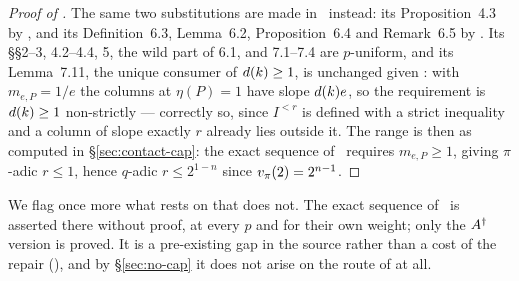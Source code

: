 \begin{proof}[Proof of ]
The same two substitutions are made in~\cite{kramermillerupton2021newton} instead:
its Proposition~4.3 by , and its Definition~6.3, Lemma~6.2,
Proposition~6.4 and Remark~6.5 by . Its \S\S2--3, 4.2--4.4,
5, the wild part of 6.1, and 7.1--7.4 are $p$-uniform, and its Lemma~7.11,
the unique consumer of $d(k)\ge 1$, is unchanged given
: with $m_{e,P} = 1/e$ the columns at $\eta(P) = 1$ have
slope $d(k)e$, so the requirement is $d(k)\ge 1$
non-strictly --- correctly so, since $I^{<r}$ is defined with a strict
inequality and a column of slope exactly $r$ already lies outside it. The
range is then as computed in \S\ref{sec:contact-cap}: the exact sequence of~\cite[\S6.2]{kramermillerupton2021newton} requires $m_{e,P}\ge 1$, giving $\pi$-adic
$r \le 1$, hence $q$-adic $r \le 2^{1-n}$ since $v_{\pi}(2) = 2^{n-1}$.
\end{proof}

We flag once more what  rests on that  does
not. The exact sequence of~\cite[\S6.2]{kramermillerupton2021newton} is asserted
there without proof, at every $p$ and for their own weight; only the
$A^{\dagger}$ version is proved. It is a pre-existing gap in the source rather
than a cost of the repair (), and by
\S\ref{sec:no-cap} it does not arise on the route of  at all.
